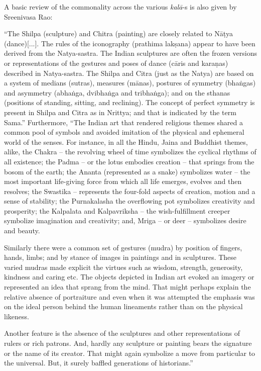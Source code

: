 A basic review of the commonality across the various \textsl{kalā}-s is also given by Sreenivasa Rao:

\begin{myquote}
“The Shilpa (sculpture) and Chitra (painting) are closely related to Nāṭya (dance)[...]. The rules of the iconography (prathima lakṣana) appear to have been derived from the Natya-sastra. The Indian sculptures are often the frozen versions or representations of the gestures and poses of dance (cāris and karaṇas) described in Natya-sastra. The Shilpa and Citra (just as the Natya) are based on a system of medians (sutras), measures (mānas), postures of symmetry (bhaṅgas) and asymmetry (abhaṅga, dvibhaṅga and tribhaṅga); and on the sthanas (positions of standing, sitting, and reclining). The concept of perfect symmetry is present in Shilpa and Citra as in Nrittya; and that is indicated by the term Sama.” Furthermore, “The Indian art that rendered religious themes shared a common pool of symbols and avoided imitation of the physical and ephemeral world of the senses. For instance, in all the Hindu, Jaina and Buddhist themes, alike, the Chakra -- the revolving wheel of time symbolizes the cyclical rhythms of all existence; the Padma -- or the lotus embodies creation -- that springs from the bosom of the earth; the Ananta (represented as a snake) symbolizes water -- the most important life-giving force from which all life emerges, evolves and then resolves; the Swastika – represents the four-fold aspects of creation, motion and a sense of stability; the Purnakalasha the overflowing pot symbolizes creativity and prosperity; the Kalpalata and Kalpavriksha -- the wish-fulfillment creeper symbolize imagination and creativity; and, Mriga -- or deer – symbolizes desire and beauty.

Similarly there were a common set of gestures (mudra) by position of fingers, hands, limbs; and by stance of images in paintings and in sculptures. These varied mudras made explicit the virtues such as wisdom, strength, generosity, kindness and caring etc. The objects depicted in Indian art evoked an imagery or represented an idea that sprang from the mind. That might perhaps explain the relative absence of portraiture and even when it was attempted the emphasis was on the ideal person behind the human lineaments rather than on the physical likeness.

Another feature is the absence of the sculptures and other representations of rulers or rich patrons. And, hardly any sculpture or painting bears the signature or the name of its creator. That might again symbolize a move from particular to the universal. But, it surely baffled generations of historians.”
\end{myquote}

